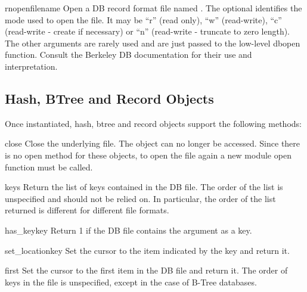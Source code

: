 \begin{funcdesc}{rnopen}{filename}
Open a DB record format file named .  The optional 
identifies the mode used to open the file.  It may be ``r'' (read only),
``w'' (read-write), ``c'' (read-write - create if necessary) or ``n''
(read-write - truncate to zero length).  The other arguments are rarely used
and are just passed to the low-level dbopen function.  Consult the
Berkeley DB documentation for their use and interpretation.
\end{funcdesc}


\begin{seealso}
\end{seealso}


\subsection{Hash, BTree and Record Objects \label{bsddb-objects}}

Once instantiated, hash, btree and record objects support the following
methods:

\begin{methoddesc}{close}{}
Close the underlying file.  The object can no longer be accessed.  Since
there is no open  method for these objects, to open the file
again a new  module open function must be called.
\end{methoddesc}

\begin{methoddesc}{keys}{}
Return the list of keys contained in the DB file.  The order of the list is
unspecified and should not be relied on.  In particular, the order of the
list returned is different for different file formats.
\end{methoddesc}

\begin{methoddesc}{has_key}{key}
Return 1 if the DB file contains the argument as a key.
\end{methoddesc}

\begin{methoddesc}{set_location}{key}
Set the cursor to the item indicated by the key and return it.
\end{methoddesc}

\begin{methoddesc}{first}{}
Set the cursor to the first item in the DB file and return it.  The order of 
keys in the file is unspecified, except in the case of B-Tree databases.
\end{methoddesc}

